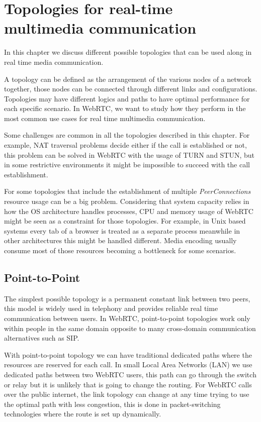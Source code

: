 \section{Topologies for real-time multimedia communication}
\label{sec:topologies}


\thispagestyle{empty}

In this chapter we discuss different possible topologies that can be used along in real time media communication.

A topology can be defined as the arrangement of the various nodes of a network together, those nodes can be connected through different links and configurations. Topologies may have different logics and paths to have optimal performance for each specific scenario. In WebRTC, we want to study how they perform in the most common use cases for real time multimedia communication.

Some challenges are common in all the topologies described in this chapter. For example, NAT traversal problems decide either if the call is established or not, this problem can be solved in WebRTC with the usage of TURN and STUN, but in some restrictive environments it might be impossible to succeed with the call establishment. 

For some topologies that include the establishment of multiple {\it PeerConnections} resource usage can be a big problem. Considering that system capacity relies in how the OS architecture handles processes, CPU and memory usage of WebRTC might be seen as a constraint for those topologies. For example, in Unix based systems every tab of a browser is treated as a separate process meanwhile in other architectures this might be handled different. Media encoding usually consume most of those resources becoming a bottleneck for some scenarios.
 
\subsection{Point-to-Point}

The simplest possible topology is a permanent constant link between two peers, this model is widely used in telephony and provides reliable real time communication between users. In WebRTC, point-to-point topologies work only within people in the same domain opposite to many cross-domain communication alternatives such as SIP.

With point-to-point topology we can have traditional dedicated paths where the resources are reserved for each call. In small Local Area Networks (LAN)  we use dedicated paths between two WebRTC users, this path can go through the switch or relay but it is unlikely that is going to change the routing. For WebRTC calls over the public internet, the link topology can change at any time trying to use the optimal path with less congestion, this is done in packet-switching technologies where the route is set up dynamically. 

